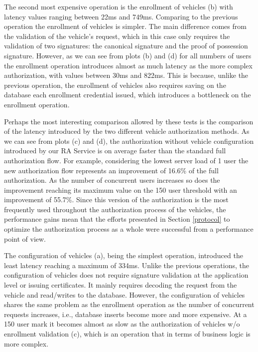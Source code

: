 	The second most expensive operation is the enrollment of vehicles (b) with latency values ranging between 22ms and 749ms. Comparing to the previous operation the enrollment of vehicles is simpler. The main difference comes from the validation of the vehicle's request, which in this case only requires the validation of two signatures: the canonical signature and the proof of possession signature. However, as we can see from plots (b) and (d) for all numbers of users the enrollment operation introduces almost as much latency as the more complex authorization, with values between 30ms and 822ms. This is because, unlike the previous operation, the enrollment of vehicles also requires saving on the database each enrollment credential issued, which introduces a bottleneck on the enrollment operation.
	
	Perhaps the most interesting comparison allowed by these tests is the comparison of the latency introduced by the two different vehicle authorization methods. As we can see from plots (c) and (d), the authorization without vehicle configuration introduced by our RA Service is on average faster than the standard full authorization flow. For example, considering the lowest server load of 1 user the new authorization flow represents an improvement of 16.6\% of the full authorization. As the number of concurrent users increases so does the improvement reaching its maximum value on the 150 user threshold with an improvement of 55.7\%. Since this version of the authorization is the most frequently used throughout the authorization process of the vehicles, the performance gains mean that the efforts presented in Section \ref{protocol} to optimize the authorization process as a whole were successful from a performance point of view. 
	
	The configuration of vehicles (a), being the simplest operation, introduced the least latency reaching a maximum of 334ms. Unlike the previous operations, the configuration of vehicles does not require signature validation at the application level or issuing certificates. It mainly requires decoding the request from the vehicle and read/writes to the database. However, the configuration of vehicles shares the same problem as the enrollment operation as the number of concurrent requests increases, i.e., database inserts become more and more expensive. At a 150 user mark it becomes almost as slow as the authorization of vehicles w/o enrollment validation (c), which is an operation that in terms of business logic is more complex. 
	
